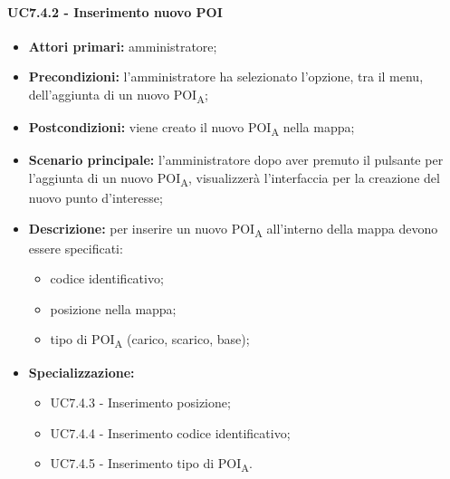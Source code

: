 \paragraph{UC7.4.2 - Inserimento nuovo POI}

\begin{itemize}
	\item 	\textbf{Attori primari:} amministratore;
	\item 	\textbf{Precondizioni:} l'amministratore ha selezionato l'opzione, tra il menu, dell'aggiunta di un nuovo POI\textsubscript{A};
	\item 	\textbf{Postcondizioni:} viene creato il nuovo POI\textsubscript{A} nella mappa;
	\item 	\textbf{Scenario principale:} l'amministratore dopo aver premuto il pulsante per l'aggiunta di un nuovo POI\textsubscript{A}, visualizzerà l'interfaccia per la creazione del nuovo punto d'interesse;
	\item 	\textbf{Descrizione:} per inserire un nuovo POI\textsubscript{A} all'interno della mappa devono essere specificati:
	\begin{itemize}
		\item codice identificativo;
		\item posizione nella mappa;
		\item tipo di POI\textsubscript{A} (carico, scarico, base);
	\end{itemize}
	\item 	\textbf{Specializzazione:}
	\begin{itemize}
		\item UC7.4.3 - Inserimento posizione;
		\item UC7.4.4 - Inserimento codice identificativo;
		\item UC7.4.5 - Inserimento tipo di POI\textsubscript{A}.
	\end{itemize}
\end{itemize}


